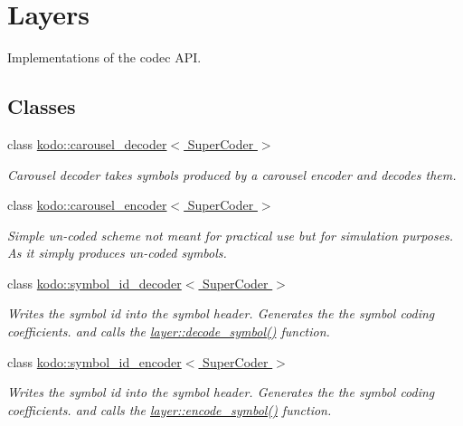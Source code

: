 \hypertarget{group__codec__header__layers}{\section{Layers}
\label{group__codec__header__layers}
}


Implementations of the codec A\-P\-I.  


\subsection*{Classes}
\begin{DoxyCompactItemize}
\item 
class \hyperlink{classkodo_1_1carousel__decoder}{kodo\-::carousel\-\_\-decoder$<$ Super\-Coder $>$}
\begin{DoxyCompactList}\small\item\em Carousel decoder takes symbols produced by a carousel encoder and decodes them. \end{DoxyCompactList}\item 
class \hyperlink{classkodo_1_1carousel__encoder}{kodo\-::carousel\-\_\-encoder$<$ Super\-Coder $>$}
\begin{DoxyCompactList}\small\item\em Simple un-\/coded scheme not meant for practical use but for simulation purposes. As it simply produces un-\/coded symbols. \end{DoxyCompactList}\item 
class \hyperlink{classkodo_1_1symbol__id__decoder}{kodo\-::symbol\-\_\-id\-\_\-decoder$<$ Super\-Coder $>$}
\begin{DoxyCompactList}\small\item\em Writes the symbol id into the symbol header. Generates the the symbol coding coefficients. and calls the \hyperlink{group__decoder__api_gae28d93bf78534b4f4f4052ad6b1f7a4d}{layer\-::decode\-\_\-symbol()} function. \end{DoxyCompactList}\item 
class \hyperlink{classkodo_1_1symbol__id__encoder}{kodo\-::symbol\-\_\-id\-\_\-encoder$<$ Super\-Coder $>$}
\begin{DoxyCompactList}\small\item\em Writes the symbol id into the symbol header. Generates the the symbol coding coefficients. and calls the \hyperlink{group__encoder__api_gaf28d3c1b82242263733ed082b1e10915}{layer\-::encode\-\_\-symbol()} function. \end{DoxyCompactList}\item 

\end{DoxyCompactItemize}
